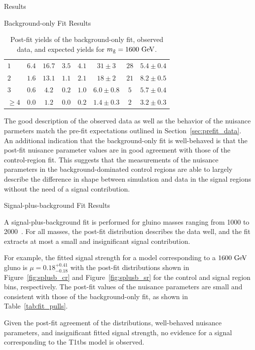 \begin{section}{Results}
\begin{subsection}{Background-only Fit Results}
\begin{table}
\begin{tabular}[tbp!]{ l | c  c  c  c | c |  c | c  }
\hline
$1$       &  $6.4$   &  $16.7$  &  $3.5$  &  $4.1$  &  $31\pm3$         &  $28$    &  $5.4 \pm 0.4$   \\
$2$       &  $1.6$   &  $13.1$  &  $1.1$  &  $2.1$  &  $18\pm2$         &  $21$    &  $8.2 \pm 0.5$   \\
$3$       &  $0.6$   &  $4.2$   &  $0.2$  &  $1.0$  &  $6.0\pm0.8$      &  $5$     &  $5.7 \pm 0.4$   \\
$\geq 4$  &  $0.0$   &  $1.2$   &  $0.0$  &  $0.2$  &  $1.4\pm0.3$      &  $2$     &  $3.2 \pm 0.3$   \\
\hline
\end{tabular}
\caption{Post-fit yields of the background-only fit, observed data, and expected yields for $m_{\tilde{\mathrm{g}}} = 1600~\mathrm{Ge\kern -0.1em V}$.}
\label{tab:bonly_yields}
\end{table}

The good description of the observed data as well as the behavior of the nuisance parmeters match the pre-fit expectations outlined in Section~\ref{sec:prefit_data}.
An additional indication that the background-only fit is well-behaved is that the post-fit nuisance parameter values are in good agreement with those of the control-region fit.
This suggests that the measurements of the nuisance parameters in the background-dominated control regions are able to largely describe the difference in \Nb shape between simulation and data in the signal regions without the need of a signal contribution.

\end{subsection}

\begin{subsection}{Signal-plus-background Fit Results}

A signal-plus-background fit is performed for gluino masses ranging from 1000 to 2000~\GeV.
For all masses, the post-fit \Nb distribution describes the data well, and the fit extracts at most a small and insignificant signal contribution.

For example, the fitted signal strength for a model corresponding to a $1600~\mathrm{Ge\kern -0.1em V}$ gluno is $\mu = 0.18^{+0.41}_{-0.18}$ with the post-fit \Nb distributions shown in Figure~\ref{fig:splusb_cr} and Figure~\ref{fig:splusb_sr} for the control and signal region bins, respectively.
The post-fit values of the nuisance parameters are small and consistent with those of the background-only fit, as shown in Table~\ref{tab:fit_pulls}.

Given the post-fit agreement of the \Nb distributions, well-behaved nuisance parameters, and insignificant fitted signal strength, no evidence for a signal corresponding to the T1tbs model is observed.


\end{subsection}
\end{section}

